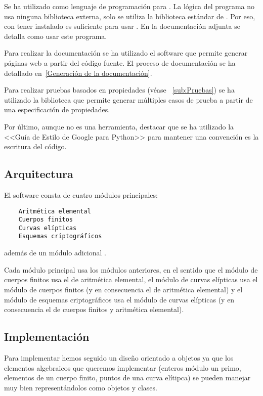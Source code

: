 Se ha utilizado  como lenguaje de programación para . La lógica del programa no usa ninguna biblioteca externa, solo se utiliza la biblioteca estándar de . Por eso, con tener  instalado es suficiente para usar . En la documentación adjunta se detalla como usar este programa.

Para realizar la documentación se ha utilizado el software  que permite generar páginas web a partir del código fuente. El proceso de documentación se ha detallado en~\ref{Generación de la documentación}.

Para realizar pruebas basados en propiedades (véase ~\ref{sub:Pruebas}) se ha utilizado la biblioteca  que permite generar múltiples casos de prueba a partir de una especificación de propiedades.

Por último, aunque no es una herramienta, destacar que se ha utilizado la <<Guía de Estilo de Google para Python>> para mantener una convención es la escritura del código.

\subsection{Arquitectura}
\label{sub:Arquitectura}

El software  consta de cuatro módulos principales:
\begin{verbatim}
    Aritmética elemental
    Cuerpos finitos
    Curvas elípticas
    Esquemas criptográficos
\end{verbatim}
además de un módulo adicional .

Cada módulo principal usa los módulos anteriores, en el sentido que el módulo de cuerpos finitos usa el de aritmética elemental, el módulo de curvas elípticas usa el módulo de cuerpos finitos (y en consecuencia el de aritmética elemental) y el módulo de esquemas criptográficos usa el módulo de curvas elípticas (y en consecuencia el de cuerpos finitos y aritmética elemental).

\subsection{Implementación}
\label{sub:Implementación}

Para implementar  hemos seguido un diseño orientado a objetos ya que los elementos algebraicos que queremos implementar (enteros módulo un primo, elementos de un cuerpo finito, puntos de una curva elítipca) se pueden manejar muy bien representándolos como objetos y clases.

